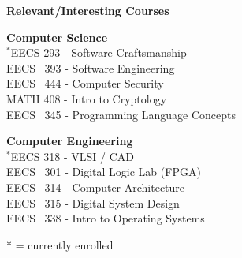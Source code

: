 \documentclass[letterpaper,11pt]{article}
\newcommand{\resheading}[1]{{\large \colorbox{shadingcolor}{\begin{minipage}{\textwidth}{\textbf{#1 \vphantom{p\^{E}}}}\end{minipage}}}}
\begin{document}
\vspace{0.1in}

%
%
\resheading{Relevant/Interesting Courses}

\vspace{0.1in}
\begin{minipage}{\linewidth}
\vfill\noindent
\begin{minipage}[b]{0.5\textwidth}
	\raggedright
	\textbf{Computer Science} \\
	$^{*}$EECS 293 - Software Craftsmanship \\
	EECS \ 393 - Software Engineering \\
	EECS \ 444 - Computer Security \\
	MATH 408 - Intro to Cryptology \\
	EECS \ 345 - Programming Language Concepts \\
\end{minipage}
\begin{minipage}[b]{0.5\textwidth}
	\raggedright
	\textbf{Computer Engineering} \\
	$^{*}$EECS 318 - VLSI / CAD \\
	EECS \ 301 - Digital Logic Lab (FPGA) \\
	EECS \ 314 - Computer Architecture \\
	EECS \ 315 - Digital System Design \\
	EECS \ 338 - Intro to Operating Systems \\
\end{minipage}

\centerline{* = currently enrolled}
\end{minipage}
\end{document}
